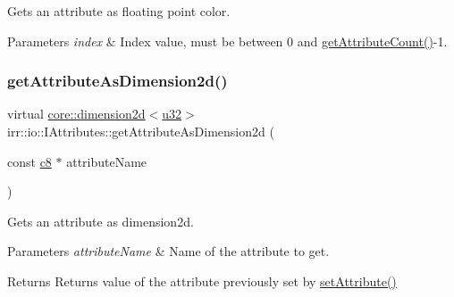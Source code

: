 Gets an attribute as floating point color. 


\begin{DoxyParams}{Parameters}
{\em index} & Index value, must be between 0 and \hyperlink{classirr_1_1io_1_1IAttributes_a796bdd9440ee7ba0b6742a90a82870b6}{get\+Attribute\+Count()}-\/1. \\
\hline
\end{DoxyParams}
\mbox{\label{classirr_1_1io_1_1IAttributes_a150afece0c99c98668a8f21247f2396f}} 
\subsubsection{\texorpdfstring{get\+Attribute\+As\+Dimension2d()}{getAttributeAsDimension2d()}\hspace{0.1cm}{\footnotesize\ttfamily [1/2]}}
{\footnotesize\ttfamily virtual \hyperlink{classirr_1_1core_1_1dimension2d}{core\+::dimension2d}$<$\hyperlink{namespaceirr_a0416a53257075833e7002efd0a18e804}{u32}$>$ irr\+::io\+::\+I\+Attributes\+::get\+Attribute\+As\+Dimension2d (\begin{DoxyParamCaption}\item[{const \hyperlink{namespaceirr_a9395eaea339bcb546b319e9c96bf7410}{c8} $\ast$}]{attribute\+Name }\end{DoxyParamCaption})\hspace{0.3cm}{\ttfamily [pure virtual]}}



Gets an attribute as dimension2d. 


\begin{DoxyParams}{Parameters}
{\em attribute\+Name} & Name of the attribute to get. \\
\hline
\end{DoxyParams}
\begin{DoxyReturn}{Returns}
Returns value of the attribute previously set by \hyperlink{classirr_1_1io_1_1IAttributes_a03fa31acb481ae23678676cc183f09a6}{set\+Attribute()} 
\end{DoxyReturn}
\mbox{\label{classirr_1_1io_1_1IAttributes_a07f89c0d3670df87242cf8b82a8c7e3f}} 
